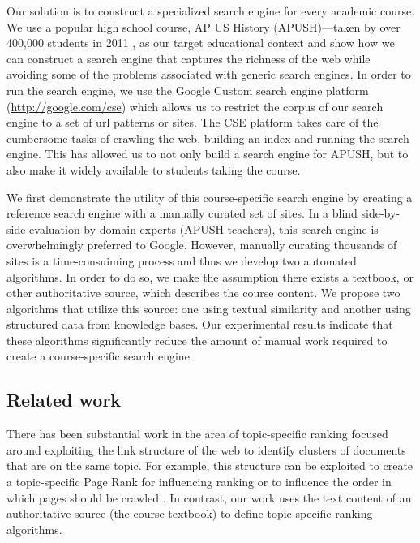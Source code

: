 \documentclass[pdfpagelabels=false,plainpages=true]{acm_proc_article-sp}
\begin{document}
Our solution is to construct a specialized search engine for every academic
course. We use a popular high school course, AP US History (APUSH)---taken by
over 400,000 students in 2011 \cite{wikipedia}, as 
our target educational context and show how we can construct a search engine
that captures the 
richness of the web while avoiding some of the problems associated with generic
search engines. In order to run the search engine, we use the Google Custom
search engine platform  (\url{http://google.com/cse}) which allows us to
restrict the corpus of our search engine to a set of url patterns or sites. The
CSE platform takes care of the cumbersome tasks of crawling the web, building an
index and running the search engine. This has allowed us to not only build a
search engine for APUSH, but to also make it widely available to students taking
the course.     

We first demonstrate the utility of this course-specific search engine by creating
a reference search engine with a manually curated set of sites. In a
blind side-by-side evaluation by domain experts (APUSH teachers), this search
engine is overwhelmingly preferred to Google. However, manually curating
thousands of sites is a time-consuiming process and thus we develop two
automated algorithms. In order to do so, we make the assumption there exists a
textbook, or other authoritative source, which describes the course content.
We propose two algorithms that utilize this source: one using textual similarity and
another using structured data from knowledge bases. Our experimental results
indicate that these algorithms significantly reduce the amount of manual work
required to create a course-specific search engine.

\subsection{Related work}

There has been substantial work in the area of topic-specific ranking focused
around exploiting the link structure of the web to identify clusters of
documents that are on the same topic. For example, this structure can be
exploited to create a topic-specific Page Rank for influencing ranking
\cite{haveliwala2003topic, hsu2006topic} or to influence the order in which
pages should be crawled \cite{buntine2004scalable}. In contrast, our work uses the
text content of an authoritative source (the course textbook) to define
topic-specific ranking algorithms.
\end{document}
